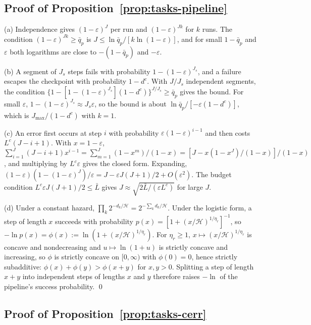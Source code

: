 \subsection*{Proof of Proposition~\ref{prop:tasks-pipeline}}

(a) Independence gives $(1-\varepsilon)^J$ per run and $(1-\varepsilon)^{Jk}$ for $k$ runs. The condition $(1-\varepsilon)^{Jk}\ge\bar q_p$ is $J\le\ln\bar q_p/[k\ln(1-\varepsilon)]$, and for small $1-\bar q_p$ and $\varepsilon$ both logarithms are close to $-(1-\bar q_p)$ and $-\varepsilon$.

(b) A segment of $J_s$ steps fails with probability $1-(1-\varepsilon)^{J_s}$, and a failure escapes the checkpoint with probability $1-d^c$. With $J/J_s$ independent segments, the condition $\{1-[1-(1-\varepsilon)^{J_s}](1-d^c)\}^{J/J_s}\ge\bar q_p$ gives the bound. For small $\varepsilon$, $1-(1-\varepsilon)^{J_s}\approx J_s\varepsilon$, so the bound is about $\ln\bar q_p/[-\varepsilon(1-d^c)]$, which is $J_{\max}/(1-d^c)$ with $k=1$.

(c) An error first occurs at step $i$ with probability $\varepsilon(1-\varepsilon)^{i-1}$ and then costs $L^c(J-i+1)$. With $x=1-\varepsilon$, $\sum_{i=1}^J(J-i+1)x^{i-1}=\sum_{m=1}^J(1-x^m)/(1-x)=[J-x(1-x^J)/(1-x)]/(1-x)$, and multiplying by $L^c\varepsilon$ gives the closed form. Expanding, $(1-\varepsilon)(1-(1-\varepsilon)^J)/\varepsilon=J-\varepsilon J(J+1)/2+O(\varepsilon^2)$. The budget condition $L^c\varepsilon J(J+1)/2\le\bar L$ gives $J\approx\sqrt{2\bar L/(\varepsilon L^c)}$ for large $J$.

(d) Under a constant hazard, $\prod_k2^{-d_k/\mathcal H}=2^{-\sum_kd_k/\mathcal H}$. Under the logistic form, a step of length $x$ succeeds with probability $p(x)=[1+(x/\mathcal H)^{1/\eta_r}]^{-1}$, so $-\ln p(x)=\phi(x):=\ln(1+(x/\mathcal H)^{1/\eta_r})$. For $\eta_r\ge 1$, $x\mapsto(x/\mathcal H)^{1/\eta_r}$ is concave and nondecreasing and $u\mapsto\ln(1+u)$ is strictly concave and increasing, so $\phi$ is strictly concave on $[0,\infty)$ with $\phi(0)=0$, hence strictly subadditive: $\phi(x)+\phi(y)>\phi(x+y)$ for $x,y>0$. Splitting a step of length $x+y$ into independent steps of lengths $x$ and $y$ therefore raises $-\ln$ of the pipeline's success probability. \qed

\subsection*{Proof of Proposition~\ref{prop:tasks-cerr}}

